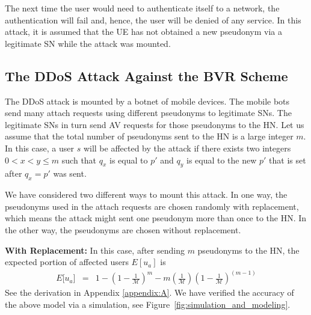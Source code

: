 \documentclass{llncs} %
\begin{document}
The next time the user would need to authenticate itself to a network, the authentication will fail and, hence, the user will be denied of any service. In this attack, it is assumed that the UE has not obtained a new pseudonym via a legitimate SN while the attack was mounted.

\subsection{The DDoS Attack Against the BVR Scheme} \label{sec:ddos_attack}
The DDoS attack is mounted by a botnet of mobile devices. The mobile bots send many attach requests using different pseudonyms to legitimate SNs. The legitimate SNs in turn send AV requests for those pseudonyms to the HN. Let us assume that the total number of pseudonyms sent to the HN is a large integer $m$. In this case, a user $s$ will be affected by the attack if there exists two integers $0 < x < y \leq m$ such that $q_{x}$ is equal to $p'$ and $q_{y}$ is equal to the new $p'$ that is set after $q_{x} = p'$ was sent.


We have considered two different ways to mount this attack. In one way, the pseudonyms used in the attach requests are chosen randomly with replacement, which means the attack might sent one pseudonym more than once to the HN. In the other way, the pseudonyms are chosen without replacement.

\textbf{With Replacement:} In this case, after sending $m$ pseudonyms to the HN, the expected portion of affected users $E[u_a]$ is
\begin{eqnarray}
E\big[ u_a \big] &=& 1- \left(1 - \frac{1}{\mathcal{M}}\right)^m - m\left(\frac{1}{\mathcal{M}}\right)\left(1 - \frac{1}{\mathcal{M}}\right)^{\left(m-1 \right)} \label{eqn:avg_with_replacement}
\end{eqnarray} 
See the derivation in Appendix \ref{appendix:A}. We have verified the accuracy of the above model via a simulation, see Figure~\ref{fig:simulation_and_modeling}.
\end{document}
